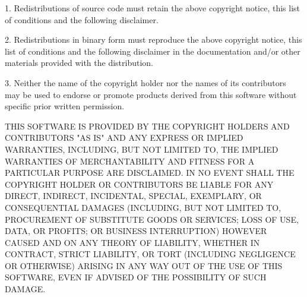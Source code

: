 1. Redistributions of source code must retain the above copyright notice, this
   list of conditions and the following disclaimer.

2. Redistributions in binary form must reproduce the above copyright notice,
   this list of conditions and the following disclaimer in the documentation
   and/or other materials provided with the distribution.

3. Neither the name of the copyright holder nor the names of its
   contributors may be used to endorse or promote products derived from
   this software without specific prior written permission.

THIS SOFTWARE IS PROVIDED BY THE COPYRIGHT HOLDERS AND CONTRIBUTORS "AS IS"
AND ANY EXPRESS OR IMPLIED WARRANTIES, INCLUDING, BUT NOT LIMITED TO, THE
IMPLIED WARRANTIES OF MERCHANTABILITY AND FITNESS FOR A PARTICULAR PURPOSE ARE
DISCLAIMED. IN NO EVENT SHALL THE COPYRIGHT HOLDER OR CONTRIBUTORS BE LIABLE
FOR ANY DIRECT, INDIRECT, INCIDENTAL, SPECIAL, EXEMPLARY, OR CONSEQUENTIAL
DAMAGES (INCLUDING, BUT NOT LIMITED TO, PROCUREMENT OF SUBSTITUTE GOODS OR
SERVICES; LOSS OF USE, DATA, OR PROFITS; OR BUSINESS INTERRUPTION) HOWEVER
CAUSED AND ON ANY THEORY OF LIABILITY, WHETHER IN CONTRACT, STRICT LIABILITY,
OR TORT (INCLUDING NEGLIGENCE OR OTHERWISE) ARISING IN ANY WAY OUT OF THE USE
OF THIS SOFTWARE, EVEN IF ADVISED OF THE POSSIBILITY OF SUCH DAMAGE.
